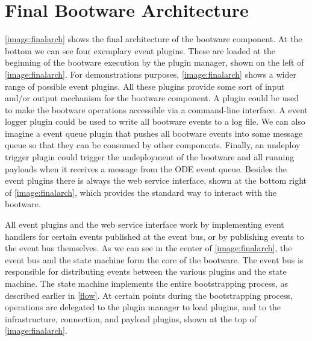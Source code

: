 \section{Final Bootware Architecture}
\label{finalarch}

\autoref{image:finalarch} shows the final architecture of the bootware component.
At the bottom we can see four exemplary event plugins.
These are loaded at the beginning of the bootware execution by the plugin manager, shown on the left of \autoref{image:finalarch}.
For demonstrations purposes, \autoref{image:finalarch} shows a wider range of possible event plugins.
All these plugins provide some sort of input and/or output mechanism for the bootware component.
A  plugin could be used to make the bootware operations accessible via a command-line interface.
A event logger plugin could be used to write all bootware events to a log file.
We can also imagine a event queue plugin that pushes all bootware events into some message queue so that they can be consumed by other components.
Finally, an undeploy trigger plugin could trigger the undeployment of the bootware and all running payloads when it receives a message from the ODE event queue.
Besides the event plugins there is always the web service interface, shown at the bottom right of \autoref{image:finalarch}, which provides the standard way to interact with the bootware.

All event plugins and the web service interface work by implementing event handlers for certain events published at the event bus, or by publishing events to the event bus themselves.
As we can see in the center of \autoref{image:finalarch}, the event bus and the state machine form the core of the bootware.
The event bus is responsible for distributing events between the various plugins and the state machine.
The state machine implements the entire bootstrapping process, as described earlier in \autoref{flow}.
At certain points during the bootstrapping process, operations are delegated to the plugin manager to load plugins, and to the infrastructure, connection, and payload plugins, shown at the top of \autoref{image:finalarch}.

